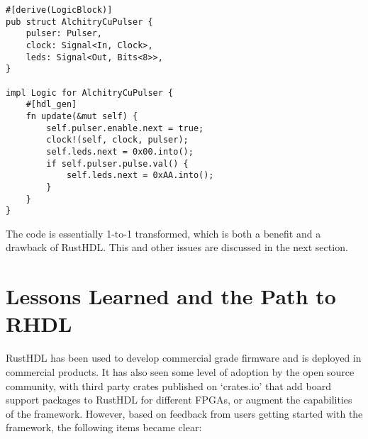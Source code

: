 \documentclass[conference]{IEEEtran}
\begin{document}
\begin{verbatim}
#[derive(LogicBlock)]
pub struct AlchitryCuPulser {
    pulser: Pulser,
    clock: Signal<In, Clock>,
    leds: Signal<Out, Bits<8>>,
}

impl Logic for AlchitryCuPulser {
    #[hdl_gen]
    fn update(&mut self) {
        self.pulser.enable.next = true;
        clock!(self, clock, pulser);
        self.leds.next = 0x00.into();
        if self.pulser.pulse.val() {
            self.leds.next = 0xAA.into();
        }
    }
}
\end{verbatim}

The code is essentially 1-to-1 transformed, which is both a benefit and a drawback of RustHDL.  This and other issues 
are discussed in the next section.

\section{Lessons Learned and the Path to RHDL}

RustHDL has been used to develop commercial grade firmware and is deployed in commercial products.  It has also seen 
some level of adoption by the open source community, with third party crates published on `crates.io' that add board
support packages to RustHDL for different FPGAs, or augment the capabilities of the framework.  However, based on
feedback from users getting started with the framework, the following items became clear:
\end{document}
